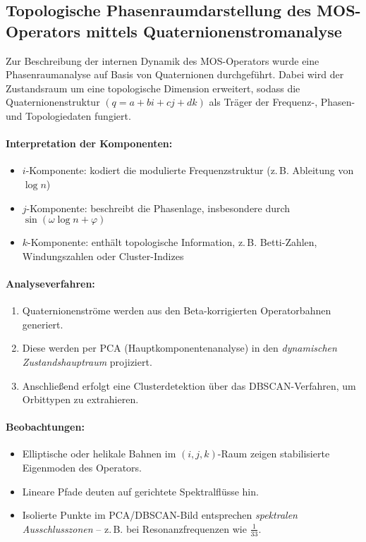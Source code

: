 \subsection*{Topologische Phasenraumdarstellung des MOS-Operators mittels Quaternionenstromanalyse}

Zur Beschreibung der internen Dynamik des MOS-Operators wurde eine Phasenraumanalyse auf Basis von Quaternionen durchgeführt. Dabei wird der Zustandsraum um eine topologische Dimension erweitert, sodass die Quaternionenstruktur $(q = a + bi + cj + dk)$ als Träger der Frequenz-, Phasen- und Topologiedaten fungiert.

\paragraph{Interpretation der Komponenten:}
\begin{itemize}
    \item $i$-Komponente: kodiert die modulierte Frequenzstruktur (z.\,B. Ableitung von $\log n$)
    \item $j$-Komponente: beschreibt die Phasenlage, insbesondere durch $\sin(\omega \log n + \varphi)$
    \item $k$-Komponente: enthält topologische Information, z.\,B. Betti-Zahlen, Windungszahlen oder Cluster-Indizes
\end{itemize}

\paragraph{Analyseverfahren:}
\begin{enumerate}
    \item Quaternionenströme werden aus den Beta-korrigierten Operatorbahnen generiert.
    \item Diese werden per PCA (Hauptkomponentenanalyse) in den \emph{dynamischen Zustandshauptraum} projiziert.
    \item Anschließend erfolgt eine Clusterdetektion über das DBSCAN-Verfahren, um Orbittypen zu extrahieren.
\end{enumerate}

\paragraph{Beobachtungen:}
\begin{itemize}
    \item Elliptische oder helikale Bahnen im $(i,j,k)$-Raum zeigen stabilisierte Eigenmoden des Operators.
    \item Lineare Pfade deuten auf gerichtete Spektralflüsse hin.
    \item Isolierte Punkte im PCA/DBSCAN-Bild entsprechen \emph{spektralen Ausschlusszonen} – z.\,B. bei Resonanzfrequenzen wie $\frac{1}{33}$.
\end{itemize}

